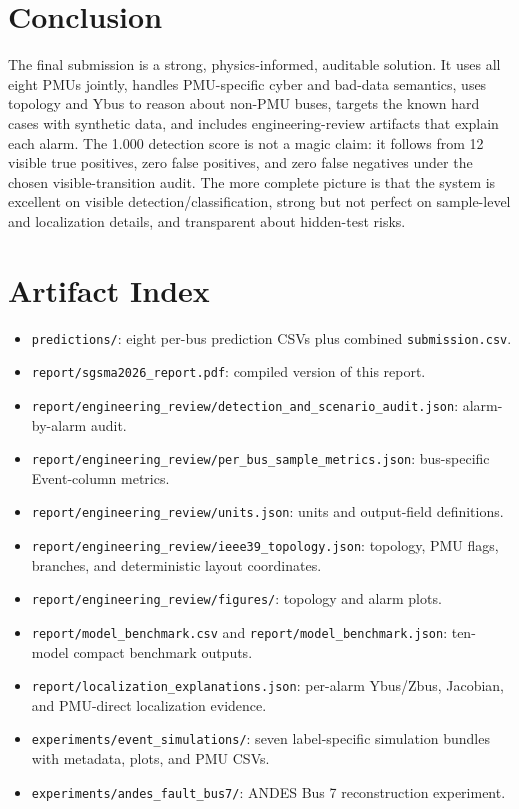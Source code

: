 \documentclass[11pt]{article}
\begin{document}
\section{Conclusion}

The final submission is a strong, physics-informed, auditable solution. It uses
all eight PMUs jointly, handles PMU-specific cyber and bad-data semantics,
uses topology and Ybus to reason about non-PMU buses, targets the known hard
cases with synthetic data, and includes engineering-review artifacts that explain
each alarm. The 1.000 detection score is not a magic claim: it follows from 12
visible true positives, zero false positives, and zero false negatives under the
chosen visible-transition audit. The more complete picture is that the system is
excellent on visible detection/classification, strong but not perfect on
sample-level and localization details, and transparent about hidden-test risks.

\section*{Artifact Index}

\begin{itemize}
  \item \texttt{predictions/}: eight per-bus prediction CSVs plus combined
  \texttt{submission.csv}.
  \item \texttt{report/sgsma2026\_report.pdf}: compiled version of this report.
  \item \texttt{report/engineering\_review/detection\_and\_scenario\_audit.json}:
  alarm-by-alarm audit.
  \item \texttt{report/engineering\_review/per\_bus\_sample\_metrics.json}:
  bus-specific Event-column metrics.
  \item \texttt{report/engineering\_review/units.json}: units and output-field
  definitions.
  \item \texttt{report/engineering\_review/ieee39\_topology.json}: topology,
  PMU flags, branches, and deterministic layout coordinates.
  \item \texttt{report/engineering\_review/figures/}: topology and alarm plots.
  \item \texttt{report/model\_benchmark.csv} and
  \texttt{report/model\_benchmark.json}: ten-model compact benchmark outputs.
  \item \texttt{report/localization\_explanations.json}: per-alarm Ybus/Zbus,
  Jacobian, and PMU-direct localization evidence.
  \item \texttt{experiments/event\_simulations/}: seven label-specific
  simulation bundles with metadata, plots, and PMU CSVs.
  \item \texttt{experiments/andes\_fault\_bus7/}: ANDES Bus 7 reconstruction
  experiment.
\end{itemize}
\end{document}
